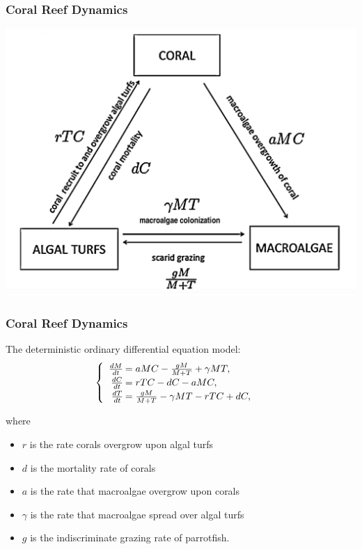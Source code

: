 \documentclass{beamer}
\begin{document}
\begin{frame}
\frametitle{Coral Reef Dynamics}
\includegraphics[scale=.175]{./coral-reef-triangle.png}
\end{frame}

\begin{frame}\frametitle{Coral Reef Dynamics}
The deterministic ordinary differential equation model:
$$\begin{cases}\begin{array}{rl}
\frac{dM}{dt}\hspace{-.8em}&=aMC - \frac{gM}{M+T} + \gamma M T, \\
\frac{dC}{dt}\hspace{-.8em}&=rTC - dC - aMC, \\
\frac{dT}{dt}\hspace{-.8em}&=\frac{gM}{M + T} - \gamma MT - rTC + dC, 
\end{array}\end{cases}$$ 

where 
\begin{itemize}\itemsep0pt
\item $r$ is the rate corals overgrow upon algal turfs\\
\item $d$ is the mortality rate of corals\\
\item $a$ is the rate that macroalgae overgrow upon corals\\
\item $\gamma$ is the rate that macroalgae spread over algal turfs\\
\item $g$ is the indiscriminate grazing rate of parrotfish.
\end{itemize}
\end{frame}
\end{document}
